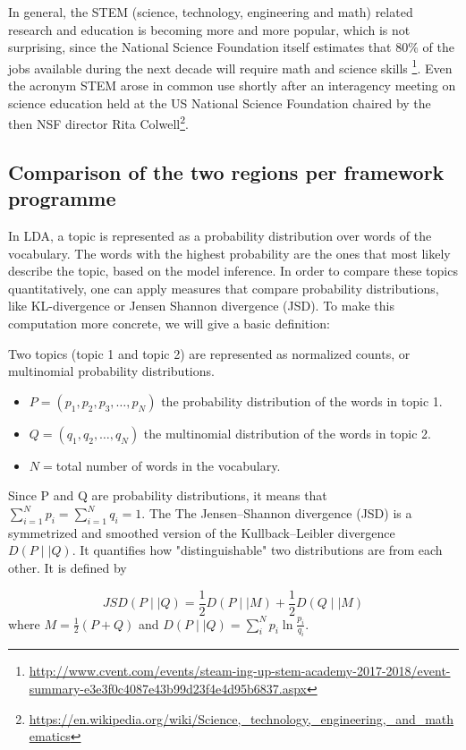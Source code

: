 \documentclass[12pt]{report}
\begin{document}
In general, the STEM (science, technology, engineering and math)
related research and education is becoming more and more popular,
which is not surprising, since the National Science Foundation itself
estimates that 80\%
 of the jobs available during the next decade
will require math and science skills \footnote{\url{http://www.cvent.com/events/steam-ing-up-stem-academy-2017-2018/event-summary-e3e3f0c4087e43b99d23f4e4d95b6837.aspx}}. Even the acronym STEM arose in common use shortly after an interagency meeting on 
science education held at the US National Science Foundation chaired by the then 
NSF director Rita Colwell\footnote{\url{https://en.wikipedia.org/wiki/Science,_technology,_engineering,_and_mathematics}}.

\subsection{Comparison of the two regions per framework programme}

In LDA, a topic is represented as a probability distribution over words of the
vocabulary. The words with the highest probability are the ones that most likely
describe the topic, based on the model inference. In order to compare these
topics quantitatively, one can apply measures that compare probability
distributions, like KL-divergence or Jensen Shannon divergence (JSD). To make
this computation more concrete, we will give a basic definition:

Two topics (topic 1 and topic 2) are represented as normalized counts, or
multinomial probability distributions.
\begin{itemize}
\item $P=(p_1, p_2, p_3,…, p_N)$ the probability distribution of the words in topic 1.
\item $Q=(q_1, q_2, …, q_N)$ the multinomial distribution of the words in topic 2.
\item $N = $total number of words in the vocabulary.
\end{itemize}

Since P and Q are probability distributions, it means that 
$\sum_{i=1}^{N} p_i = \sum_{i=1}^{N} q_i = 1$. The The Jensen–Shannon 
divergence (JSD) is a
symmetrized and smoothed version of the Kullback–Leibler divergence
$D(P \mid\mid Q)$. It quantifies how "distinguishable" two distributions are
from each other. It is defined by

\begin{equation}
JSD(P \mid\mid Q) = \frac{1}{2}D(P \mid\mid M) + \frac{1}{2}D(Q \mid\mid M)
\end{equation}
where $M = \frac{1}{2}(P + Q)$ and $D(P \mid\mid Q) = \sum_{i}^{N} p_i \ln\frac{p_i}{q_i}$.
\end{document}
